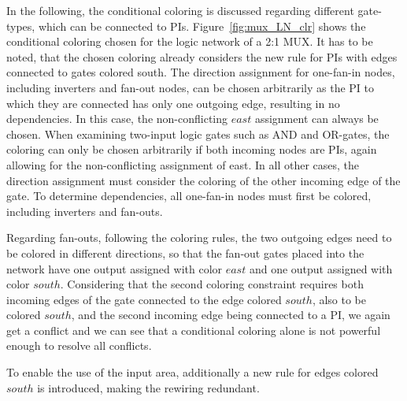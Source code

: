 In the following, the conditional coloring is discussed regarding different gate-types, which can be connected to PIs. Figure~\ref{fig:mux_LN_clr} shows the conditional coloring chosen for the logic network of a 2:1 MUX. It has to be noted, that the chosen coloring already considers the new rule for PIs with edges connected to gates colored south.
The direction assignment for one-fan-in nodes, including inverters and fan-out nodes, can be chosen arbitrarily as the PI to which they are connected has only one outgoing edge, resulting in no dependencies. In this case, the non-conflicting $east$ assignment can always be chosen. When examining two-input logic gates such as AND and OR-gates, the coloring can only be chosen arbitrarily if both incoming nodes are PIs, again allowing for the non-conflicting assignment of east. In all other cases, the direction assignment must consider the coloring of the other incoming edge of the gate. To determine dependencies, all one-fan-in nodes must first be colored, including inverters and fan-outs.

Regarding fan-outs, following the coloring rules, the two outgoing edges need to be colored in different directions, so that the fan-out gates placed into the network have one output assigned with color $east$ and one output assigned with color $south$. Considering that the second coloring constraint requires both incoming edges of the gate connected to the edge colored $south$, also to be colored $south$, and the second incoming edge being connected to a PI, we again get a conflict and we can see that a conditional coloring alone is not powerful enough to resolve all conflicts.

To enable the use of the input area, additionally a new rule for edges colored $south$ is introduced, making the rewiring redundant.

